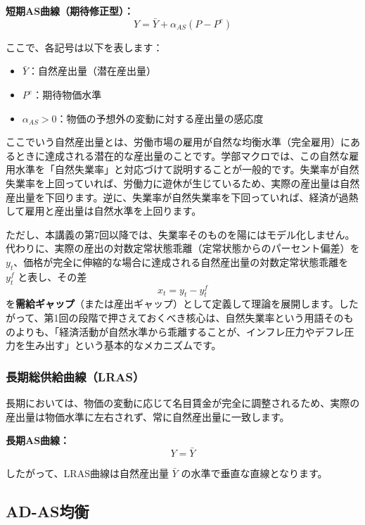 \documentclass[
  japanese,
  lualatex,
  ja=standard,
  12pt,
  a4paper]{ltjsarticle}
\providecommand{\tightlist}{%
  \setlength{\itemsep}{0pt}\setlength{\parskip}{0pt}}
\begin{document}

\textbf{短期AS曲線（期待修正型）：} \[
Y = \bar{Y} + \alpha_{AS}(P - P^e)
\]

ここで、各記号は以下を表します：

\begin{itemize}
\tightlist
\item
  \(\bar{Y}\)：自然産出量（潜在産出量）
\item
  \(P^e\)：期待物価水準
\item
  \(\alpha_{AS} > 0\)：物価の予想外の変動に対する産出量の感応度
\end{itemize}

ここでいう自然産出量とは、労働市場の雇用が自然な均衡水準（完全雇用）にあるときに達成される潜在的な産出量のことです。学部マクロでは、この自然な雇用水準を「自然失業率」と対応づけて説明することが一般的です。失業率が自然失業率を上回っていれば、労働力に遊休が生じているため、実際の産出量は自然産出量を下回ります。逆に、失業率が自然失業率を下回っていれば、経済が過熱して雇用と産出量は自然水準を上回ります。

ただし、本講義の第7回以降では、失業率そのものを陽にはモデル化しません。代わりに、実際の産出の対数定常状態乖離（定常状態からのパーセント偏差）を
\(y_t\)、価格が完全に伸縮的な場合に達成される自然産出量の対数定常状態乖離を
\(y_t^f\) と表し、その差 \[
x_t = y_t-y_t^f
\]
を\textbf{需給ギャップ}（または産出ギャップ）として定義して理論を展開します。したがって、第1回の段階で押さえておくべき核心は、自然失業率という用語そのものよりも、「経済活動が自然水準から乖離することが、インフレ圧力やデフレ圧力を生み出す」という基本的なメカニズムです。

\subsubsection{長期総供給曲線（LRAS）}\label{ux9577ux671fux7dcfux4f9bux7d66ux66f2ux7ddalras}

長期においては、物価の変動に応じて名目賃金が完全に調整されるため、実際の産出量は物価水準に左右されず、常に自然産出量に一致します。


\textbf{長期AS曲線：} \[
Y = \bar{Y}
\]

したがって、LRAS曲線は自然産出量 \(\bar{Y}\)
の水準で垂直な直線となります。

\subsection{AD-AS均衡}\label{ad-asux5747ux8861}
\end{document}
